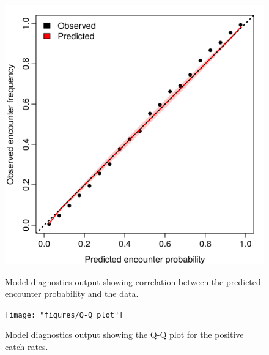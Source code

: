 \documentclass{article}
\begin{document}
\begin{figure}[!ht]
\begin{center}
	\includegraphics[width = 0.9\linewidth]{"figures/Diag--Encounter_prob"}
	\label{fig:S12}
	\caption{Model diagnostics output showing correlation between the
		predicted encounter probability and the data.}
	\end{center}
\end{figure}

\begin{figure}[!ht]
\begin{center}
	\texttt{[image: "figures/Q-Q\_plot"]}
	\label{fig:S13}
	\caption{Model diagnostics output showing the Q-Q plot for the positive
	catch rates.}
	\end{center}
\end{figure}
\end{document}
